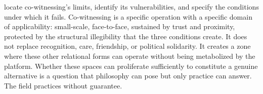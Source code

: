 locate co-witnessing’s limits, identify its vulnerabilities, and specify the conditions under which it fails. Co-witnessing is a specific operation with a specific domain of applicability: small-scale, face-to-face, sustained by trust and proximity, protected by the structural illegibility that the three conditions create. It does not replace recognition, care, friendship, or political solidarity. It creates a zone where these other relational forms can operate without being metabolized by the platform. Whether these spaces can proliferate sufficiently to constitute a genuine alternative is a question that philosophy can pose but only practice can answer. The field practices without guarantee.
